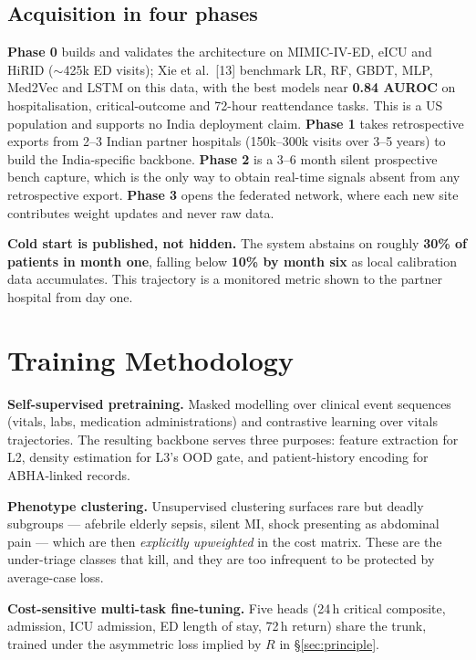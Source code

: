 \documentclass[10pt,a4paper,twocolumn]{article}
\begin{document}
\subsection{Acquisition in four phases}
\textbf{Phase 0} builds and validates the architecture on MIMIC-IV-ED, eICU and HiRID
($\sim$425k ED visits); Xie et al.\ [13] benchmark LR, RF, GBDT, MLP,
Med2Vec and LSTM on this data, with the best models near \textbf{0.84 AUROC} on
hospitalisation, critical-outcome and 72-hour reattendance tasks. This is a US
population and supports no India deployment claim.
\textbf{Phase 1} takes retrospective exports from 2--3 Indian partner hospitals
(150k--300k visits over 3--5 years) to build the India-specific backbone.
\textbf{Phase 2} is a 3--6 month silent prospective bench capture, which is the only
way to obtain real-time signals absent from any retrospective export.
\textbf{Phase 3} opens the federated network, where each new site contributes weight
updates and never raw data.

\begin{tcolorbox}[mpbox]
\textbf{Cold start is published, not hidden.} The system abstains on roughly
\textbf{30\% of patients in month one}, falling below \textbf{10\% by month six} as
local calibration data accumulates. This trajectory is a monitored metric shown to
the partner hospital from day one.
\end{tcolorbox}


\section{Training Methodology}
\label{sec:train}

\textbf{Self-supervised pretraining.} Masked modelling over clinical event sequences
(vitals, labs, medication administrations) and contrastive learning over vitals
trajectories. The resulting backbone serves three purposes: feature extraction for
L2, density estimation for L3's OOD gate, and patient-history encoding for
ABHA-linked records.

\textbf{Phenotype clustering.} Unsupervised clustering surfaces rare but deadly
subgroups --- afebrile elderly sepsis, silent MI, shock presenting as abdominal pain
--- which are then \emph{explicitly upweighted} in the cost matrix. These are the
under-triage classes that kill, and they are too infrequent to be protected by
average-case loss.

\textbf{Cost-sensitive multi-task fine-tuning.} Five heads (24\,h critical composite,
admission, ICU admission, ED length of stay, 72\,h return) share the trunk, trained
under the asymmetric loss implied by $R$ in \S\ref{sec:principle}.
\end{document}
